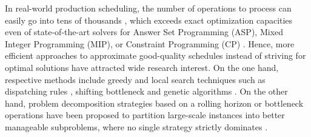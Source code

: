 \documentclass{tlp} %
\begin{document}

In real-world production scheduling, the number of operations to process can easily go
into tens of thousands \citep{coltep19a,kohakamo20a,kotakoscge21a}, which exceeds exact
optimization capacities even of state-of-the-art solvers for Answer Set Programming (ASP),
Mixed Integer Programming (MIP), or Constraint Programming (CP)
\citep{daneshamooz2021mathematical,francescutto2021solving,shi2021solving}.
Hence, more efficient approaches to approximate good-quality schedules 
instead of striving for optimal solutions have attracted wide research interest.
On the one hand, respective methods include greedy and local search techniques such as
dispatching rules \citep{blackstone1982state}, shifting bottleneck \citep{adams1988shifting} and
genetic algorithms \citep{pezzella2008genetic}.
On the other hand, problem decomposition strategies based on a
rolling horizon \citep{singer2001decomposition,liu2008prediction} or
bottleneck operations \citep{zhang2010hybrid,zhai2014decomposition} 
have been proposed to partition large-scale instances into better manageable subproblems,
where no single strategy strictly dominates \citep{ovacik2012decomposition}.

\end{document}
